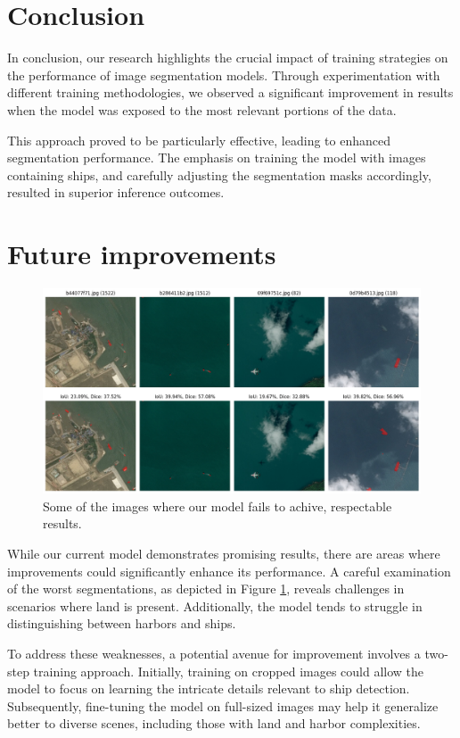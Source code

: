 \documentclass{article}
\begin{document}
\section{Conclusion}


In conclusion, our research highlights the crucial impact of training strategies on the performance of image segmentation
models. Through experimentation with different training methodologies, we observed a significant improvement in results when
the model was exposed to the most relevant portions of the data.

This approach proved to be particularly effective, leading to enhanced segmentation performance. The emphasis on training the model
with images containing ships, and carefully adjusting the segmentation masks accordingly, resulted in superior inference outcomes.


\section{Future improvements}


\begin{figure}[!hb]
  \centering
  \includegraphics[width=\textwidth]{bad-segmentations}
  \caption{
    Some of the images where our model fails to achive,
    respectable results.
  }
  \label{fig:badsegmentations}
\end{figure}

While our current model demonstrates promising results, there are areas where improvements could significantly enhance its
performance. A careful examination of the worst segmentations, as depicted in Figure \ref{fig:badsegmentations}, reveals
challenges in scenarios where land is present. Additionally, the model tends to struggle in distinguishing between
harbors and ships.

To address these weaknesses, a potential avenue for improvement involves a two-step training approach. Initially, training
on cropped images could allow the model to focus on learning the intricate details relevant to ship detection. Subsequently,
fine-tuning the model on full-sized images may help it generalize better to diverse scenes, including those with land and harbor
complexities.
\end{document}
